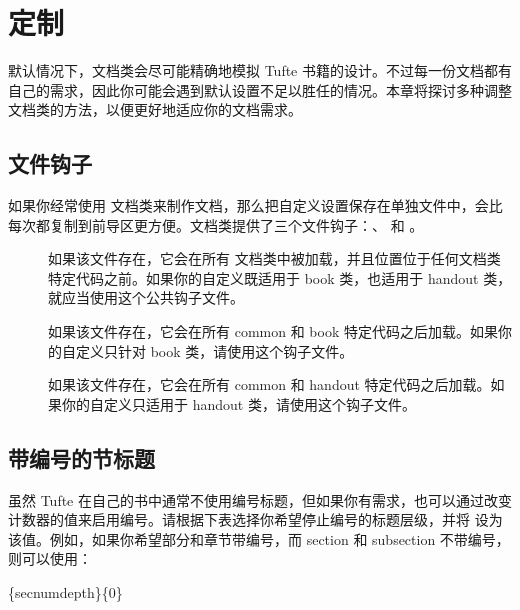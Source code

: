 


\chapter[定制 Tufte-LaTeX]{定制 \TL}
\label{ch:customizing}

默认情况下，\TL 文档类会尽可能精确地模拟 Tufte 书籍的设计。不过每一份文档都有自己的需求，因此你可能会遇到默认设置不足以胜任的情况。本章将探讨多种调整 \TL 文档类的方法，以便更好地适应你的文档需求。

\section{文件钩子}
\label{sec:filehooks}

如果你经常使用 \TL 文档类来制作文档，那么把自定义设置保存在单独文件中，会比每次都复制到前导区更方便。\TL 文档类提供了三个文件钩子：、 和 。\sloppy

\begin{description}
  \item[]
    如果该文件存在，它会在所有 \TL 文档类中被加载，并且位置位于任何文档类特定代码之前。如果你的自定义既适用于 book 类，也适用于 handout 类，就应当使用这个公共钩子文件。
  \item[]
    如果该文件存在，它会在所有 common 和 book 特定代码之后加载。如果你的自定义只针对 book 类，请使用这个钩子文件。
  \item[]
    如果该文件存在，它会在所有 common 和 handout 特定代码之后加载。如果你的自定义只适用于 handout 类，请使用这个钩子文件。
\end{description}


\section{带编号的节标题}
\label{sec:numbered-sections}

虽然 Tufte 在自己的书中通常不使用编号标题，但如果你有需求，也可以通过改变  计数器的值来启用编号。请根据下表选择你希望停止编号的标题层级，并将  设为该值。例如，如果你希望部分和章节带编号，而 section 和 subsection 不带编号，则可以使用：
\begin{docspec}
  \{secnumdepth\}\{0\}
\end{docspec}

